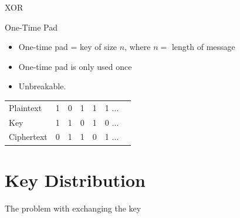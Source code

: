 \documentclass{beamer}
\begin{document}
	\begin{frame}{XOR} %

	\end{frame}

	\begin{frame}{One-Time Pad} %
		\begin{itemize}
			\item One-time pad = key of size $n$, where $n=$ length of message

			\item One-time pad is only used once

			\item Unbreakable.

		\end{itemize}

		\begin{table}
			\begin{tabular}{l | c c c c c c }
				Plaintext  & 1 & 0 & 1 & 1 & 1 $\hdots$ \\
				Key        & 1 & 1 & 0 & 1 & 0 $\hdots$ \\
				Ciphertext & 0 & 1 & 1 & 0 & 1 $\hdots$ \\
			\end{tabular}
		\end{table}
	\end{frame}

	\section{Key Distribution}
	\begin{frame}{The problem with exchanging the key} %

	\end{frame}

\end{document}
